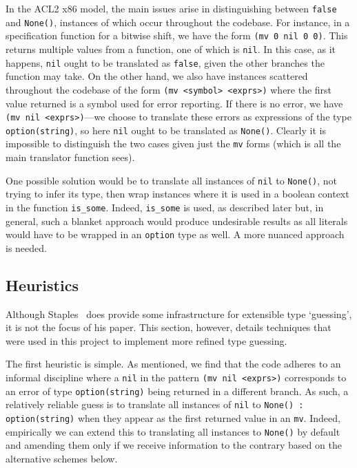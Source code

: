\documentclass[a4paper,12pt,twoside,openright]{report}
\begin{document}
In the ACL2 x86 model, the main issues arise in distinguishing between \texttt{false} and \texttt{None()}, instances of which occur throughout the codebase.  For instance, in a specification function for a bitwise shift, we have the form \texttt{(mv 0 nil 0 0)}.  This returns multiple values from a function, one of which is \texttt{nil}.  In this case, as it happens, \texttt{nil} ought to be translated as \texttt{false}, given the other branches the function may take.  On the other hand, we also have instances scattered throughout the codebase of the form \texttt{(mv <symbol> <exprs>)} where the first value returned is a symbol used for error reporting.  If there is no error, we have \texttt{(mv nil <exprs>)}---we choose to translate these errors as expressions of the type \texttt{option(string)}, so here \texttt{nil} ought to be translated as \texttt{None()}.  Clearly it is impossible to distinguish the two cases given just the \texttt{mv} forms (which is all the main translator function sees).

One possible solution would be to translate all instances of \texttt{nil} to \texttt{None()}, not trying to infer its type, then wrap instances where it is used in a boolean context in the function \texttt{is\_some}.  Indeed, \texttt{is\_some} is used, as described later but, in general, such a blanket approach would produce undesirable results as all literals would have to be wrapped in an \texttt{option} type as well.  A more nuanced approach is needed.

\hypertarget{heuristics}{
\subsection{Heuristics}\label{heuristics}}

Although Staples~\cite{staples} does provide some infrastructure for extensible type `guessing', it is not the focus of his paper.  This section, however, details techniques that were used in this project to implement more refined type guessing.

The first heuristic is simple.  As mentioned, we find that the code adheres to an informal discipline where a \texttt{nil} in the pattern \texttt{(mv nil <exprs>)} corresponds to an error of type \texttt{option(string)} being returned in a different branch.  As such, a relatively reliable guess is to translate all instances of \texttt{nil} to \texttt{None() : option(string)} when they appear as the first returned value in an \texttt{mv}.  Indeed, empirically we can extend this to translating all instances to  \texttt{None()} by default and amending them only if we receive information to the contrary based on the alternative schemes below.
\end{document}
